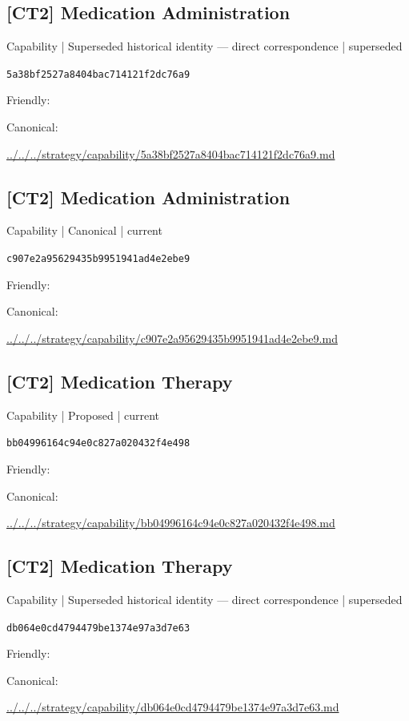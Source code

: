 \documentclass[10pt,a4paper]{article}
\begin{document}
\subsection*{[CT2] Medication Administration}
{\small Capability | Superseded historical identity — direct correspondence | superseded}\par
\texttt{5a38bf2527a8404bac714121f2dc76a9}\par
Friendly: \par
Canonical: \par
{\footnotesize\url{../../../strategy/capability/5a38bf2527a8404bac714121f2dc76a9.md}}\par
\subsection*{[CT2] Medication Administration}
{\small Capability | Canonical | current}\par
\texttt{c907e2a95629435b9951941ad4e2ebe9}\par
Friendly: \par
Canonical: \par
{\footnotesize\url{../../../strategy/capability/c907e2a95629435b9951941ad4e2ebe9.md}}\par
\subsection*{[CT2] Medication Therapy}
{\small Capability | Proposed | current}\par
\texttt{bb04996164c94e0c827a020432f4e498}\par
Friendly: \par
Canonical: \par
{\footnotesize\url{../../../strategy/capability/bb04996164c94e0c827a020432f4e498.md}}\par
\subsection*{[CT2] Medication Therapy}
{\small Capability | Superseded historical identity — direct correspondence | superseded}\par
\texttt{db064e0cd4794479be1374e97a3d7e63}\par
Friendly: \par
Canonical: \par
{\footnotesize\url{../../../strategy/capability/db064e0cd4794479be1374e97a3d7e63.md}}\par
\end{document}
